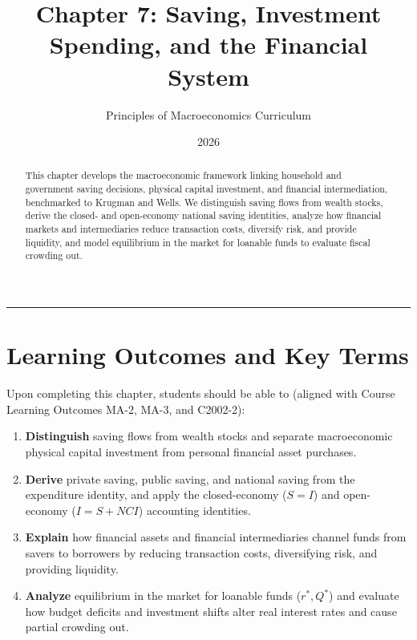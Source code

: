 \documentclass[11pt,letterpaper]{article}
\begin{document}
\title{\Huge\bfseries\color{SlateBlue} Chapter 7: Saving, Investment Spending, and the Financial System}
\author{\large Principles of Macroeconomics Curriculum}
\date{2026}
\maketitle

\thispagestyle{plain}

\begin{abstract}
This chapter develops the macroeconomic framework linking household and government saving decisions, physical capital investment, and financial intermediation, benchmarked to Krugman and Wells. We distinguish saving flows from wealth stocks, derive the closed- and open-economy national saving identities, analyze how financial markets and intermediaries reduce transaction costs, diversify risk, and provide liquidity, and model equilibrium in the market for loanable funds to evaluate fiscal crowding out.
\end{abstract}

\tableofcontents
\vspace{1.5em}
\hrule
\vspace{1.5em}

\section*{Learning Outcomes and Key Terms}

Upon completing this chapter, students should be able to (aligned with Course Learning Outcomes MA-2, MA-3, and C2002-2):
\begin{enumerate}
  \item \textbf{Distinguish} saving flows from wealth stocks and separate macroeconomic physical capital investment from personal financial asset purchases.
  \item \textbf{Derive} private saving, public saving, and national saving from the expenditure identity, and apply the closed-economy ($S = I$) and open-economy ($I = S + NCI$) accounting identities.
  \item \textbf{Explain} how financial assets and financial intermediaries channel funds from savers to borrowers by reducing transaction costs, diversifying risk, and providing liquidity.
  \item \textbf{Analyze} equilibrium in the market for loanable funds ($r^*, Q^*$) and evaluate how budget deficits and investment shifts alter real interest rates and cause partial crowding out.
\end{enumerate}
\end{document}
